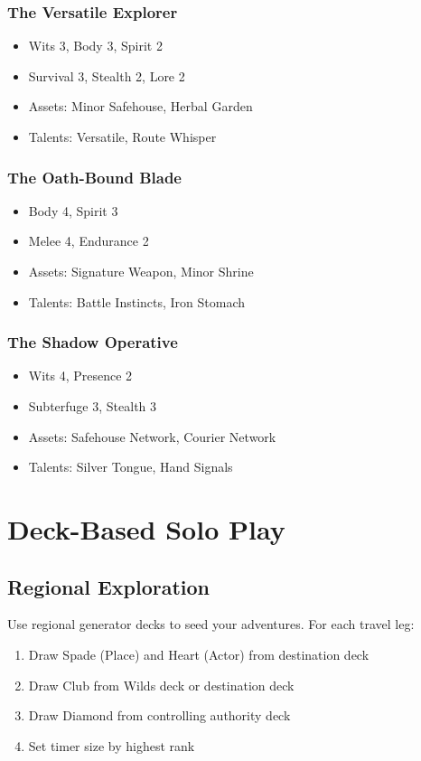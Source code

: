 \documentclass[11pt]{article}
\begin{document}
\subsubsection{The Versatile Explorer}
\begin{itemize}
    \item Wits 3, Body 3, Spirit 2
    \item Survival 3, Stealth 2, Lore 2
    \item Assets: Minor Safehouse, Herbal Garden
    \item Talents: Versatile, Route Whisper
\end{itemize}

\subsubsection{The Oath-Bound Blade}
\begin{itemize}
    \item Body 4, Spirit 3
    \item Melee 4, Endurance 2
    \item Assets: Signature Weapon, Minor Shrine
    \item Talents: Battle Instincts, Iron Stomach
\end{itemize}

\subsubsection{The Shadow Operative}
\begin{itemize}
    \item Wits 4, Presence 2
    \item Subterfuge 3, Stealth 3
    \item Assets: Safehouse Network, Courier Network
    \item Talents: Silver Tongue, Hand Signals
\end{itemize}

\section{Deck-Based Solo Play}

\subsection{Regional Exploration}

Use regional generator decks to seed your adventures. For each travel leg:

\begin{enumerate}
    \item Draw Spade (Place) and Heart (Actor) from destination deck
    \item Draw Club from Wilds deck or destination deck
    \item Draw Diamond from controlling authority deck
    \item Set timer size by highest rank
\end{enumerate}
\end{document}
